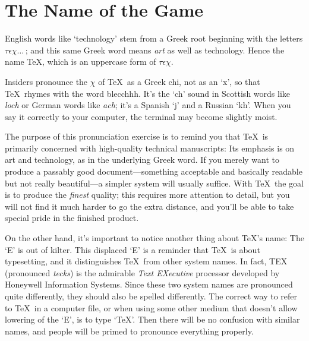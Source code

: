 \chapter{The Name of the Game}

English words like `technology' stem from a Greek root beginning with
the letters $\tau\epsilon\chi\ldots\,$; and this same Greek word means {\sl
art\/} as well as technology. Hence the name \TeX, which is an
uppercase form of $\tau\epsilon\chi$.

Insiders pronounce the $\chi$ of \TeX\ as a Greek chi, not as an `x', so that
\TeX\ rhymes with the word blecchhh. It's the `ch' sound in Scottish words
like {\sl loch\/} or German words like {\sl ach\/}; it's a Spanish `j' and a
Russian `kh'. When you say it correctly to your computer, the terminal
may become slightly moist.

The purpose of this pronunciation exercise is to remind you that \TeX\ is
primarily concerned with high-quality technical manuscripts: Its emphasis is
on art and technology, as in the underlying Greek word. If you merely want
to produce a passably good document---something acceptable and basically
readable but not really beautiful---a simpler system will usually suffice.
With \TeX\ the goal is to produce the {\sl finest\/} quality; this requires
more attention to detail, but you will not find it much harder to go the
extra distance, and you'll be able to take special pride in the finished
product. 

On the other hand, it's important to notice another thing about \TeX's name:
The `E' is out of kilter. This 
displaced `E' is a reminder that \TeX\ is about typesetting, and it
distinguishes \TeX\ from other system names. In fact, TEX (pronounced
{\sl tecks\/}) is the admirable {\sl Text EXecutive\/} processor developed by
Honeywell Information Systems. Since these two system names are
pronounced quite differently, they should also be spelled differently. The
correct way to refer to \TeX\ in a computer file, or when using some other
medium that doesn't allow lowering of the `E', is to type `TeX'. Then
there will be no confusion with similar names, and people will be
primed to pronounce everything properly.

